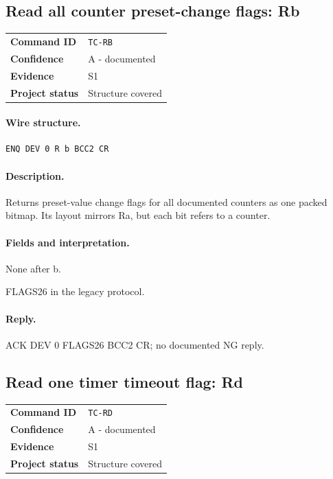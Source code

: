 \documentclass[10pt,letterpaper]{article}
\begin{document}
\subsection{Read all counter preset-change flags: Rb}
\begin{tabularx}{\textwidth}{@{}>{\bfseries}p{2.8cm}X@{}}
Command ID & \texttt{TC-RB} \\
Confidence & A - documented \\
Evidence & S1 \\
Project status & Structure covered \\
\end{tabularx}
\vspace{0.35em}
\paragraph{Wire structure.}
\begin{Verbatim}[breaklines=true,breakanywhere=true,fontsize=\small]
ENQ DEV 0 R b BCC2 CR
\end{Verbatim}
\paragraph{Description.} Returns preset-value change flags for all documented counters as one packed bitmap. Its layout mirrors Ra, but each bit refers to a counter.
\paragraph{Fields and interpretation.}
\begin{description}[style=nextline,leftmargin=3.2cm,labelwidth=3.0cm,font=\normalfont\bfseries]
\item[Request payload] None after b.
\item[Reply data] FLAGS26 in the legacy protocol.
\end{description}
\paragraph{Reply.} ACK DEV 0 FLAGS26 BCC2 CR; no documented NG reply.

\subsection{Read one timer timeout flag: Rd}
\begin{tabularx}{\textwidth}{@{}>{\bfseries}p{2.8cm}X@{}}
Command ID & \texttt{TC-RD} \\
Confidence & A - documented \\
Evidence & S1 \\
Project status & Structure covered \\
\end{tabularx}
\vspace{0.35em}
\end{document}
